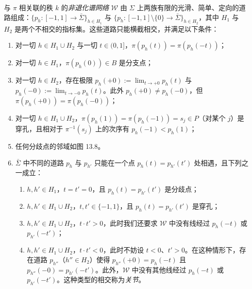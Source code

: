 \begin{definition}[13.12]
与 $\pi$ 相关联的秩 $k$ 的\emph{非退化谱网络} $\mathcal{W}$ 由 $\Sigma$ 上两族有限的光滑、简单、定向的道路组成：$\{p_h\colon[-1,1]\to\bar\Sigma\}_{h\in H_1}$ 与 $\{p_h\colon[-1,1]\setminus\{0\}\to\bar\Sigma\}_{h\in H_2}$，其中 $H_1$ 与 $H_2$ 是两个不相交的指标集。这些道路只能横截相交，并满足以下条件：
\begin{enumerate}
\item 对一切 $h\in H_1\cup H_2$ 与一切 $t\in(0,1]$，$\pi(p_h(t))=\pi(p_h(-t))$；
\item 对一切 $h\in H_1$，$\pi(p_h(0))\in B$ 是分支点；
\item 对一切 $h\in H_2$，存在极限 $p_h(+0):=\lim_{t\to+0}p_h(t)$ 与 $p_h(-0):=\lim_{t\to-0}p_h(t)$。此外 $p_h(+0)\neq p_h(-0)$，但 $\pi(p_h(+0))=\pi(p_h(-0))$；
\item 对一切 $h\in H_1\cup H_2$，$\pi(p_h(1))=\pi(p_h(-1))=s_j\in P$（对某个 $j$）是穿孔，且相对于 $\pi^{-1}(s_j)$ 上的次序有 $p_h(-1)<p_h(1)$；
\item 任何分歧点的邻域如图 13.8。
\item $\bar\Sigma$ 中不同的道路 $p_h$ 与 $p_{h'}$ 只能在一个点 $p_h(t)=p_{h'}(t')$ 处相遇，且下列之一成立：
\begin{enumerate}
\item $h,h'\in H_1$，$t=t'=0$，且 $p_h(t)=p_{h'}(t')$ 是分歧点；
\item $h,h'\in H_1\cup H_2$，$t,t'\in\{-1,1\}$，且 $p_h(t)=p_{h'}(t')$ 是穿孔；
\item $h,h'\in H_1\cup H_2$，$t\cdot t'>0$，此时我们还要求 $\mathcal{W}$ 中没有线经过 $p_h(-t)$ 或 $p_{h'}(-t')$；
\item $h,h'\in H_1\cup H_2$，$t\cdot t'<0$，此时不妨设 $t<0$、$t'>0$。在这种情形下，存在道路 $p_{h''}$（$h''\in H_2$）使得 $p_{h''}(+0)=p_h(-t)$ 且 $p_{h''}(-0)=p_{h'}(-t')$。此外，$\mathcal{W}$ 中没有其他线经过 $p_h(-t)$ 或 $p_{h'}(-t')$。这种类型的相交称为\emph{关节}。
\end{enumerate}
\end{enumerate}
\end{definition}



